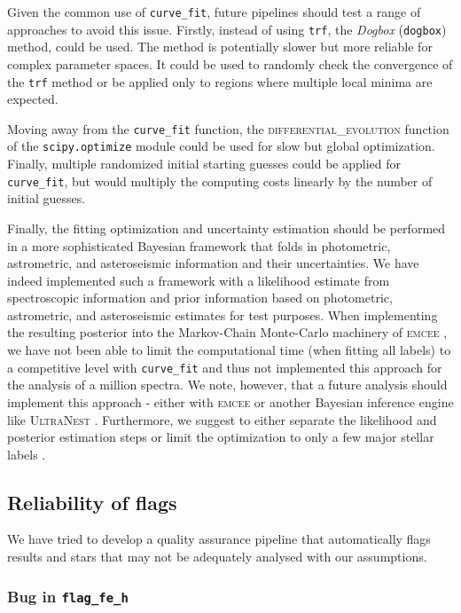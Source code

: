 \documentclass[
  journal=pasa,
  manuscript=research-paper, %
  year=2024,
  volume=37
]{cup-journal}
\begin{document}
Given the common use of \texttt{curve\_fit}, future pipelines should test a range of approaches to avoid this issue. Firstly, instead of using \texttt{trf}, the \textit{Dogbox} (\texttt{dogbox}) method,  could be used. The method is potentially slower but more reliable for complex parameter spaces. It could be used to randomly check the convergence of the \texttt{trf} method or be applied only to regions where multiple local minima are expected.

Moving away from the \texttt{curve\_fit} function, the \textsc{differential\_evolution} function of the \texttt{scipy.optimize} module could be used for slow but global optimization. Finally, multiple randomized initial starting guesses could be applied for \texttt{curve\_fit}, but would multiply the computing costs linearly by the number of initial guesses.

Finally, the fitting optimization and uncertainty estimation should be performed in a more sophisticated Bayesian framework that folds in photometric, astrometric, and asteroseismic information and their uncertainties. We have indeed implemented such a framework with a likelihood estimate from spectroscopic information and prior information based on photometric, astrometric, and asteroseismic estimates for test purposes. When implementing the resulting posterior into the Markov-Chain Monte-Carlo machinery of \textsc{emcee} \citep{ForemanMackey2013}, we have not been able to limit the computational time (when fitting all labels) to a competitive level with \texttt{curve\_fit} and thus not implemented this approach for the analysis of a million spectra. We note, however, that a future analysis should implement this approach - either with \textsc{emcee} or another Bayesian inference engine like \textsc{UltraNest} \citep{Buchner2021}. Furthermore, we suggest to either separate the likelihood and posterior estimation steps \citep[see e.g.][]{Gent2022} or limit the optimization to only a few major stellar labels \citep[see e.g.][]{Traven2020}.

\subsection{Reliability of flags} \label{sec:caveats_flags}

We have tried to develop a quality assurance pipeline that automatically flags results and stars that may not be adequately analysed with our assumptions.

\subsubsection{Bug in \texttt{flag\_fe\_h}}
\end{document}
